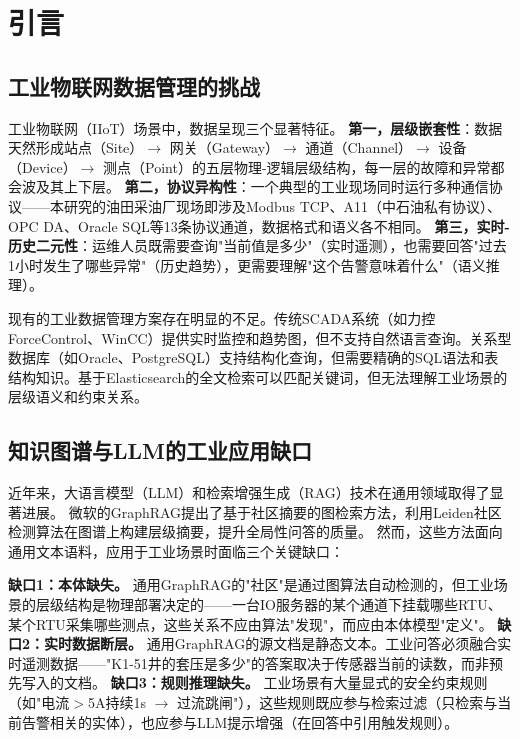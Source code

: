 \documentclass[12pt,a4paper]{article}
\begin{document}
\begin{abstract}
\vspace{6pt}
\noindent\textbf{Keywords:} GraphRAG; Industrial IoT; Ontology Model; Real-Time Telemetry; Alarm Diagnosis; Edge Computing
\end{abstract}

\section{引言}

\subsection{工业物联网数据管理的挑战}

工业物联网（IIoT）场景中，数据呈现三个显著特征。
\textbf{第一，层级嵌套性}：数据天然形成站点（Site）$\to$ 网关（Gateway）$\to$ 通道（Channel）$\to$ 设备（Device）$\to$ 测点（Point）的五层物理-逻辑层级结构，每一层的故障和异常都会波及其上下层。
\textbf{第二，协议异构性}：一个典型的工业现场同时运行多种通信协议——本研究的油田采油厂现场即涉及Modbus TCP、A11（中石油私有协议）、OPC DA、Oracle SQL等13条协议通道，数据格式和语义各不相同。
\textbf{第三，实时-历史二元性}：运维人员既需要查询"当前值是多少"（实时遥测），也需要回答"过去1小时发生了哪些异常"（历史趋势），更需要理解"这个告警意味着什么"（语义推理）。

现有的工业数据管理方案存在明显的不足。传统SCADA系统（如力控ForceControl、WinCC）提供实时监控和趋势图，但不支持自然语言查询。关系型数据库（如Oracle、PostgreSQL）支持结构化查询，但需要精确的SQL语法和表结构知识。基于Elasticsearch的全文检索可以匹配关键词，但无法理解工业场景的层级语义和约束关系。

\subsection{知识图谱与LLM的工业应用缺口}

近年来，大语言模型（LLM）和检索增强生成（RAG）技术在通用领域取得了显著进展。
微软的GraphRAG\cite{graphrag2024}提出了基于社区摘要的图检索方法，利用Leiden社区检测算法在图谱上构建层级摘要，提升全局性问答的质量。
然而，这些方法面向通用文本语料，应用于工业场景时面临三个关键缺口：

\textbf{缺口1：本体缺失。} 通用GraphRAG的"社区"是通过图算法自动检测的，但工业场景的层级结构是物理部署决定的——一台IO服务器的某个通道下挂载哪些RTU、某个RTU采集哪些测点，这些关系不应由算法"发现"，而应由本体模型"定义"。
\textbf{缺口2：实时数据断层。} 通用GraphRAG的源文档是静态文本。工业问答必须融合实时遥测数据——"K1-51井的套压是多少"的答案取决于传感器当前的读数，而非预先写入的文档。
\textbf{缺口3：规则推理缺失。} 工业场景有大量显式的安全约束规则（如"电流$>$5A持续1s $\to$ 过流跳闸"），这些规则既应参与检索过滤（只检索与当前告警相关的实体），也应参与LLM提示增强（在回答中引用触发规则）。
\end{document}
